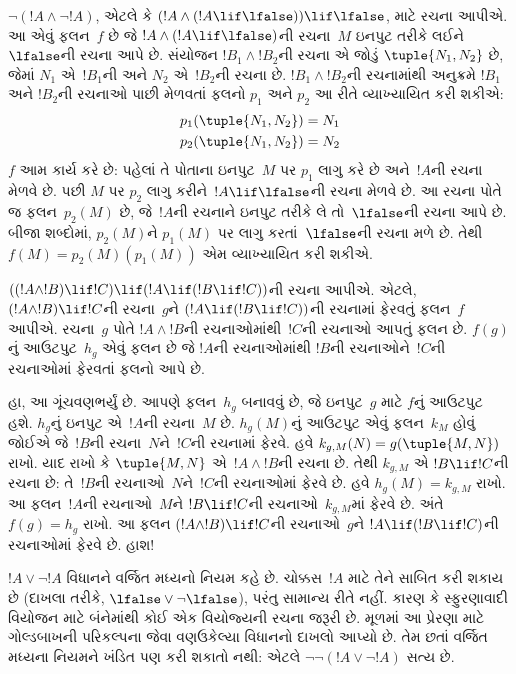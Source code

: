 \begin{ex}
$\lnot(!A \land \lnot !A)$, એટલે કે $(!A
\land (!A \lif \lfalse)) \lif \lfalse$, માટે રચના આપીએ.
આ એવું ફલન~$f$ છે જે $!A \land (!A \lif \lfalse)$ની
રચના~$M$ ઇનપુટ તરીકે લઈને~$\lfalse$ની રચના આપે છે.
સંયોજન $!B_1 \land !B_2$ની રચના એ જોડું $\tuple{N_1, N_2}$
છે, જેમાં $N_1$ એ~$!B_1$ની અને $N_2$ એ~$!B_2$ની રચના છે.
$!B_1 \land !B_2$ની રચનામાંથી અનુક્રમે $!B_1$ અને $!B_2$ની
રચનાઓ પાછી મેળવતાં ફલનો $p_1$ અને $p_2$ આ રીતે વ્યાખ્યાયિત
કરી શકીએ:
\begin{align*}
  p_1(\tuple{N_1, N_2}) &= N_1\\
  p_2(\tuple{N_1, N_2}) &= N_2
\end{align*}
$f$ આમ કાર્ય કરે છે: પહેલાં તે પોતાના ઇનપુટ~$M$ પર $p_1$
લાગુ કરે છે અને~$!A$ની રચના મેળવે છે. પછી $M$ પર $p_2$
લાગુ કરીને~$!A \lif \lfalse$ની રચના મેળવે છે. આ રચના
પોતે જ ફલન~$p_2(M)$ છે, જે~$!A$ની રચનાને ઇનપુટ તરીકે
લે તો~$\lfalse$ની રચના આપે છે. બીજા શબ્દોમાં, $p_2(M)$ને
$p_1(M)$ પર લાગુ કરતાં~$\lfalse$ની રચના મળે છે. તેથી
$f(M) = p_2(M)(p_1(M))$ એમ વ્યાખ્યાયિત કરી શકીએ.
\end{ex}

\begin{ex}
$((!A \land !B) \lif !C) \lif (!A \lif (!B \lif !C))$ની
રચના આપીએ. એટલે, $(!A \land !B) \lif !C$ની રચના~$g$ને
$(!A \lif (!B \lif !C))$ની રચનામાં ફેરવતું ફલન~$f$
આપીએ. રચના~$g$ પોતે $!A \land !B$ની રચનાઓમાંથી~$!C$ની
રચનાઓ આપતું ફલન છે. 
$f(g)$નું આઉટપુટ~$h_g$ એવું ફલન છે જે $!A$ની રચનાઓમાંથી
$!B$ની રચનાઓને~$!C$ની રચનાઓમાં ફેરવતાં ફલનો આપે છે.

હા, આ ગૂંચવણભર્યું છે. આપણે ફલન~$h_g$ બનાવવું છે, જે
ઇનપુટ~$g$ માટે $f$નું આઉટપુટ હશે. $h_g$નું ઇનપુટ એ~$!A$ની
રચના~$M$ છે. $h_g(M)$નું આઉટપુટ એવું ફલન~$k_M$ હોવું જોઈએ
જે~$!B$ની રચના~$N$ને~$!C$ની રચનામાં ફેરવે. હવે
$k_{g,M}(N) = g(\tuple{M, N})$ રાખો. યાદ રાખો કે
$\tuple{M, N}$ એ~$!A \land !B$ની રચના છે. તેથી
$k_{g,M}$ એ $!B \lif !C$ની રચના છે: તે~$!B$ની
રચનાઓ~$N$ને~$!C$ની રચનાઓમાં ફેરવે છે. હવે
$h_g(M) = k_{g,M}$ રાખો. આ ફલન~$!A$ની રચનાઓ~$M$ને
$!B \lif !C$ની રચનાઓ~$k_{g,M}$માં ફેરવે છે. અંતે
$f(g) = h_g$ રાખો. આ ફલન $(!A \land !B) \lif !C$ની
રચનાઓ~$g$ને $!A \lif (!B \lif !C)$ની રચનાઓમાં ફેરવે
છે. હાશ!{}
\end{ex}

$!A \lor \lnot !A$ વિધાનને વર્જિત મધ્યનો નિયમ કહે છે.
ચોક્કસ~$!A$ માટે તેને સાબિત કરી શકાય છે (દાખલા તરીકે,
$\lfalse \lor \lnot \lfalse$), પરંતુ સામાન્ય રીતે નહીં.
કારણ કે સ્ફુરણાવાદી વિયોજન માટે બંનેમાંથી કોઈ એક વિયોજ્યની
રચના જરૂરી છે. મૂળમાં આ પ્રેરણા માટે ગોલ્ડબાખની પરિકલ્પના
જેવા વણઉકેલ્યા વિધાનનો દાખલો આપ્યો છે.
તેમ છતાં વર્જિત મધ્યના નિયમને ખંડિત પણ કરી શકાતો નથી:
એટલે $\lnot \lnot (!A \lor \lnot !A)$ સત્ય છે.

